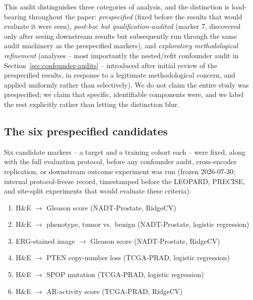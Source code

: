 \label{sec:prespecified}

This audit distinguishes three categories of analysis, and the distinction is load-bearing
throughout the paper: \emph{prespecified} (fixed before the results that would evaluate it were
seen), \emph{post-hoc but qualification-audited} (marker 7, discovered only after seeing
downstream results but subsequently run through the same audit machinery as the prespecified
markers), and \emph{exploratory methodological refinement} (analyses -- most importantly the
nested/refit confounder audit in Section~\ref{sec:confounder-audits} -- introduced after initial
review of the prespecified results, in response to a legitimate methodological concern, and
applied uniformly rather than selectively). We do not claim the entire study was prespecified;
we claim that specific, identifiable components were, and we label the rest explicitly rather
than letting the distinction blur.

\subsection{The six prespecified candidates}

Six candidate markers -- a target and a training cohort each -- were fixed, along with the full
evaluation protocol, before any confounder audit, cross-encoder replication, or downstream
outcome experiment was run (frozen 2026-07-30; internal protocol-freeze record, timestamped
before the LEOPARD, PRECISE, and site-split experiments that would evaluate these criteria):

\begin{enumerate}
\item[(1)] H\&E $\rightarrow$ Gleason score (NADT-Prostate, RidgeCV)
\item[(2)] H\&E $\rightarrow$ phenotype, tumor vs.\ benign (NADT-Prostate, logistic regression)
\item[(3)] ERG-stained image $\rightarrow$ Gleason score (NADT-Prostate, RidgeCV)
\item[(4)] H\&E $\rightarrow$ PTEN copy-number loss (TCGA-PRAD, logistic regression)
\item[(5)] H\&E $\rightarrow$ SPOP mutation (TCGA-PRAD, logistic regression)
\item[(6)] H\&E $\rightarrow$ AR-activity score (TCGA-PRAD, RidgeCV)
\end{enumerate}

